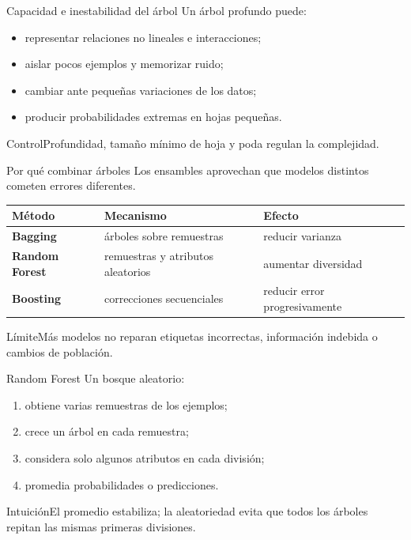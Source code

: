 \documentclass[aspectratio=169,10pt]{beamer}
\begin{document}
\begin{frame}{Capacidad e inestabilidad del árbol}
  \small
  Un árbol profundo puede:
  \begin{itemize}
    \item representar relaciones no lineales e interacciones;
    \item aislar pocos ejemplos y memorizar ruido;
    \item cambiar ante pequeñas variaciones de los datos;
    \item producir probabilidades extremas en hojas pequeñas.
  \end{itemize}
  \begin{block}{Control}Profundidad, tamaño mínimo de hoja y poda regulan la complejidad.\end{block}
\end{frame}

\begin{frame}{Por qué combinar árboles}
  \footnotesize
  Los ensambles aprovechan que modelos distintos cometen errores diferentes.
  \begin{tabularx}{\textwidth}{>{\bfseries}p{}p{}X}\toprule
  Método & Mecanismo & Efecto\\\midrule
  Bagging & árboles sobre remuestras & reducir varianza\\
  Random Forest & remuestras y atributos aleatorios & aumentar diversidad\\
  Boosting & correcciones secuenciales & reducir error progresivamente\\\bottomrule
  \end{tabularx}
  \begin{alertblock}{Límite}Más modelos no reparan etiquetas incorrectas, información indebida o cambios de población.\end{alertblock}
\end{frame}

\begin{frame}{Random Forest}
  \small
  Un bosque aleatorio:
  \begin{enumerate}
    \item obtiene varias remuestras de los ejemplos;
    \item crece un árbol en cada remuestra;
    \item considera solo algunos atributos en cada división;
    \item promedia probabilidades o predicciones.
  \end{enumerate}
  \begin{block}{Intuición}El promedio estabiliza; la aleatoriedad evita que todos los árboles repitan las mismas primeras divisiones.\end{block}
\end{frame}
\end{document}

